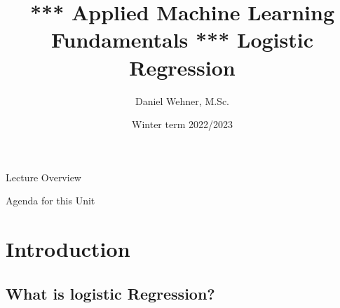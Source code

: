 


\title[Logistic Regression]{*** Applied Machine Learning Fundamentals *** Logistic Regression}
\author{Daniel Wehner, M.Sc.}
\date{Winter term 2022/2023}




\maketitlepage


\begin{frame}{Lecture Overview}{}
\end{frame}


\begin{frame}{Agenda for this Unit}
	\begin{multicols}{2}
		\tableofcontents
	\end{multicols}
\end{frame}


\section{Introduction}

\subsection{What is logistic Regression?}

